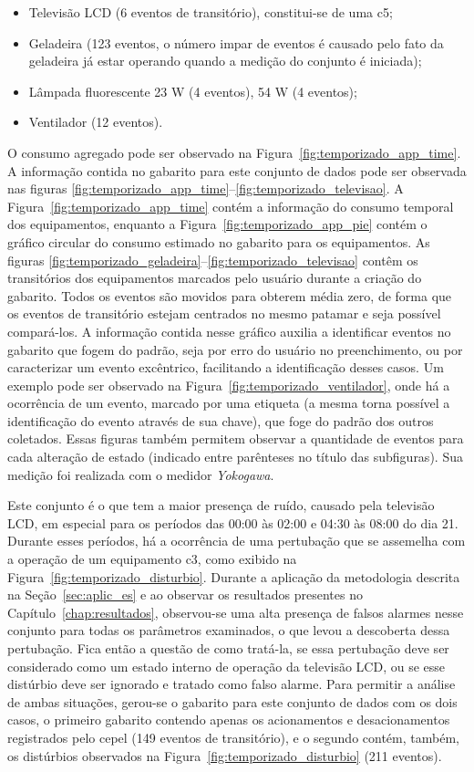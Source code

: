 \begin{itemize}
\item Televisão LCD (6 eventos de transitório), constitui-se de uma \acs{c5};
\item Geladeira (123 eventos, o número impar de eventos é causado pelo
fato da geladeira já estar operando quando a medição do conjunto é
iniciada);
\item Lâmpada fluorescente 23 W (4 eventos), 54 W (4 eventos);
\item Ventilador (12 eventos).
\end{itemize}

O consumo agregado pode ser observado na
Figura~\ref{fig:temporizado_app_time}. A informação contida no
gabarito para este conjunto de dados pode ser observada nas figuras
\ref{fig:temporizado_app_time}--\ref{fig:temporizado_televisao}.
A Figura~\ref{fig:temporizado_app_time} contém a informação do consumo
temporal dos equipamentos, enquanto a
Figura~\ref{fig:temporizado_app_pie} contém o gráfico circular do
consumo estimado no gabarito para os equipamentos. As figuras
\ref{fig:temporizado_geladeira}--\ref{fig:temporizado_televisao}
contêm os transitórios dos equipamentos marcados pelo usuário durante
a criação do gabarito. Todos os eventos são movidos para obterem média
zero, de forma que os eventos de transitório estejam centrados no mesmo
patamar e seja possível compará-los. A informação contida nesse
gráfico auxilia a identificar eventos no gabarito que fogem do padrão,
seja por erro do usuário no preenchimento, ou por caracterizar um
evento excêntrico, facilitando a identificação desses casos. Um
exemplo pode ser observado na Figura~\ref{fig:temporizado_ventilador},
onde há a ocorrência de um evento, marcado por uma etiqueta (a mesma
torna possível a identificação do evento através de sua chave), que
foge do padrão dos outros coletados. Essas figuras também permitem
observar a quantidade de eventos para cada alteração de estado
(indicado entre parênteses no título das subfiguras). Sua medição foi
realizada com o medidor \emph{Yokogawa}.

Este conjunto é o que tem a maior presença de ruído, causado pela
televisão LCD, em especial para os períodos das 00:00 às 02:00 e 04:30
às 08:00 do dia 21. Durante esses períodos, há a ocorrência de uma
pertubação que se assemelha com a operação de um equipamento \acs{c3},
como exibido na Figura~\ref{fig:temporizado_disturbio}. Durante a
aplicação da metodologia descrita na Seção~\ref{sec:aplic_es} e ao
observar os resultados presentes no Capítulo~\ref{chap:resultados},
observou-se uma alta presença de falsos alarmes nesse conjunto para
todas os parâmetros examinados, o que levou a descoberta dessa
pertubação. Fica então a questão de como tratá-la, se essa pertubação
deve ser considerado como um estado interno de operação da televisão
LCD, ou se esse distúrbio deve ser ignorado e tratado como falso
alarme. Para permitir a análise de ambas situações, gerou-se o
gabarito para este conjunto de dados com os dois casos, o primeiro
gabarito contendo apenas os acionamentos e desacionamentos registrados
pelo \acs{cepel} (149 eventos de transitório), e o segundo contém,
também, os distúrbios observados na
Figura~\ref{fig:temporizado_disturbio} (211 eventos).

